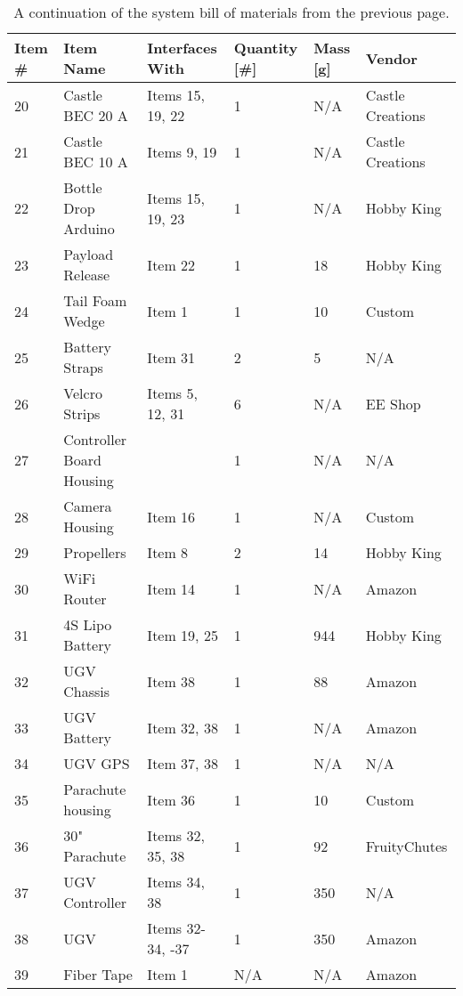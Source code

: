 \documentclass[]{auvsi_doc}
\begin{document}
	\begin{table}[h!]
		\begin{center}
			\caption{A continuation of the system bill of materials from the previous page.}
			\label{table:BOM}
			\begin{tabular}{p{1cm}p{4cm}p{3cm}p{1.5cm}p{1cm}p{2.5cm}}
				\toprule
				Item \# & Item Name & Interfaces With & Quantity [\#] & Mass [g] & Vendor \\
				\midrule
				20 & Castle BEC 20 A & Items 15, 19, 22 & 1 & N/A & Castle \newline Creations \\
				21 & Castle BEC 10 A & Items 9, 19 & 1 & N/A & Castle \newline Creations \\
				22 & Bottle Drop Arduino & Items 15, 19, 23 & 1 & N/A & Hobby King \\
				23 & Payload Release & Item 22 & 1 & 18 & Hobby King \\
				24 & Tail Foam Wedge & Item 1 & 1 & 10 & Custom \\
				25 & Battery Straps & Item 31 & 2 & 5 & N/A \\
				26 & Velcro Strips & Items 5, 12, 31 & 6 & N/A & EE Shop \\
				27 & Controller Board \newline Housing &   & 1 & N/A & N/A \\
				28 & Camera Housing & Item 16 & 1 & N/A & Custom \\
				29 & Propellers & Item 8 & 2 & 14 & Hobby King \\
				30 & WiFi Router & Item 14 & 1 & N/A & Amazon \\
				31 & 4S Lipo Battery & Item 19, 25 & 1 & 944 & Hobby King \\
				32 & UGV Chassis & Item 38 & 1 & 88 & Amazon \\
				33 & UGV Battery & Item 32, 38 & 1 & N/A & Amazon \\
				34 & UGV GPS & Item 37, 38 & 1 & N/A & N/A \\
				35 & Parachute housing & Item 36 & 1 & 10 & Custom \\
				36 & 30" Parachute & Items 32, 35, 38 & 1 & 92 & FruityChutes \\
				37 & UGV Controller & Items 34, 38 & 1 & 350 & N/A \\
				38 & UGV & Items 32-34, \newline 36-37 & 1 & 350 & Amazon \\
				39 & Fiber Tape & Item 1 & N/A & N/A & Amazon \\
				\bottomrule
			\end{tabular}
		\end{center}
	\end{table}
	
\end{document}
